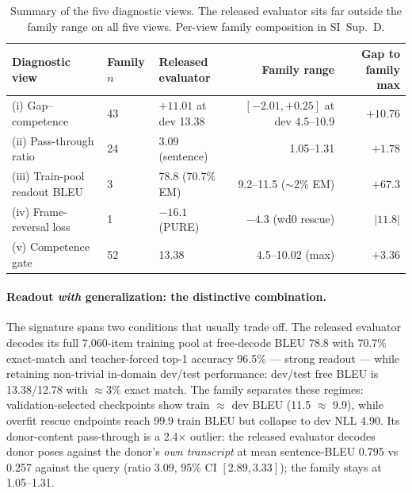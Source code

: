 \documentclass[pdflatex,sn-chicago]{sn-jnl}
\begin{document}
\begin{table}[h]
\centering
\scriptsize\setlength{\tabcolsep}{3pt}
\caption{Summary of the five diagnostic views. The released evaluator sits far outside the family range on all five views. Per-view family composition in SI~Sup.~D.}
\label{tab:diagnostic_summary}
\begin{tabular}{p{3.0cm}p{1.0cm}p{2.8cm}rr}
\toprule
Diagnostic view & Family $n$ & Released evaluator & Family range & Gap to family max \\
\midrule
(i) Gap--competence & 43 & $+11.01$ at dev 13.38 & $[-2.01, +0.25]$ at dev 4.5--10.9 & $+10.76$ \\
(ii) Pass-through ratio & 24 & 3.09 (sentence) & 1.05--1.31 & $+1.78$ \\
(iii) Train-pool readout BLEU & 3 & 78.8 (70.7\% EM) & 9.2--11.5 ($\sim$2\% EM) & $+67.3$ \\
(iv) Frame-reversal loss & 1 & $-16.1$ (PURE) & $-4.3$ (wd0 rescue) & $|11.8|$ \\
(v) Competence gate & 52 & 13.38 & 4.5--10.02 (max) & $+3.36$ \\
\bottomrule
\end{tabular}
\end{table}

\paragraph{Readout \emph{with} generalization: the distinctive combination.}
\label{sec:insample}
The signature spans two conditions that usually trade off. The released evaluator decodes its full 7{,}060-item training pool at free-decode BLEU 78.8 with 70.7\% exact-match and teacher-forced top-1 accuracy 96.5\% --- strong readout --- while retaining non-trivial in-domain dev/test performance: dev/test free BLEU is 13.38/12.78 with $\approx$3\% exact match. The family separates these regimes: validation-selected checkpoints show train $\approx$ dev BLEU (11.5 $\approx$ 9.9), while overfit rescue endpoints reach 99.9 train BLEU but collapse to dev NLL 4.90. Its donor-content pass-through is a 2.4$\times$ outlier: the released evaluator decodes donor poses against the donor's \emph{own transcript} at mean sentence-BLEU 0.795 vs 0.257 against the query (ratio 3.09, 95\% CI $[2.89,3.33]$); the family stays at 1.05--1.31.
\end{document}

